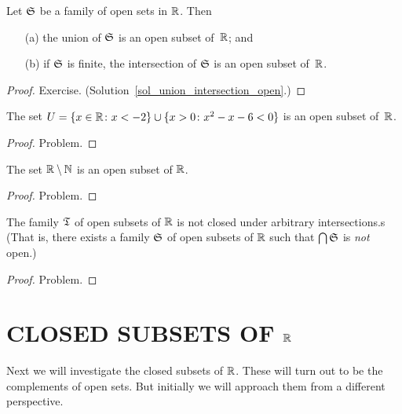 \begin{prop}\label{union_intersection_open} Let $\mathfrak{S}$ be a family of open sets in $\mathbb{R}$.
Then
 \begin{enumerate}
   \item[(a)] the union of $\mathfrak{S}$ is an open subset of~$\mathbb{R}$; and
   \item[(b)] if $\mathfrak{S}$ is finite, the intersection of $\mathfrak{S}$ is
an open subset of~$\mathbb{R}$.
 \end{enumerate}
\end{prop}

\begin{proof} Exercise. (Solution~\ref{sol_union_intersection_open}.)  \ns \end{proof}

\begin{exam} The set $U = \{x \in \mathbb{R}\colon  x < -2\} \cup \{x > 0\colon x^2-x-6 < 0\}$ is an
open subset of~$\mathbb{R}$.
\end{exam}

\begin{proof} Problem. \ns \end{proof}

\begin{exam} The set $\mathbb{R} \setminus \mathbb{N}$ is an open subset of $\mathbb{R}$.
\end{exam}

\begin{proof} Problem. \ns \end{proof}

\begin{exam} The family $\mathfrak{T}$ of open subsets of $\mathbb{R}$ is not closed under arbitrary
intersections.s (That is, there exists a family $\mathfrak{S}$ of open subsets of $\mathbb{R}$ such
that $\bigcap \mathfrak{S}$ is \emph{not} open.)
\end{exam}

\begin{proof} Problem. \ns \end{proof}







\section{CLOSED SUBSETS OF $\mathbb{R}$}
Next we will investigate the closed subsets of $\mathbb{R}$.  These will turn out to be the
complements of open sets.  But initially we will approach them from a different perspective.

